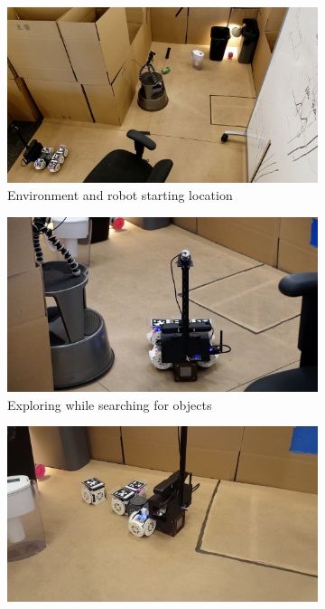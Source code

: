 \documentclass[journal]{IEEEtran}
\begin{document}
\begin{figure}[t]
      \centering
      \begin{subfigure}[t]{0.32\textwidth}
        \includegraphics[width=\textwidth]{images/overhead_starting.jpg}
        \caption{Environment and robot starting location}
    \end{subfigure}
    \begin{subfigure}[t]{0.32\textwidth}
        \includegraphics[width=\textwidth]{images/exploration.jpg}
        \caption{Exploring  while searching for objects}
    \end{subfigure}
    \begin{subfigure}[t]{0.32\textwidth}
        \includegraphics[width=\textwidth]{images/reconfiguration.png}

\end{subfigure}
\end{figure}
\end{document}
